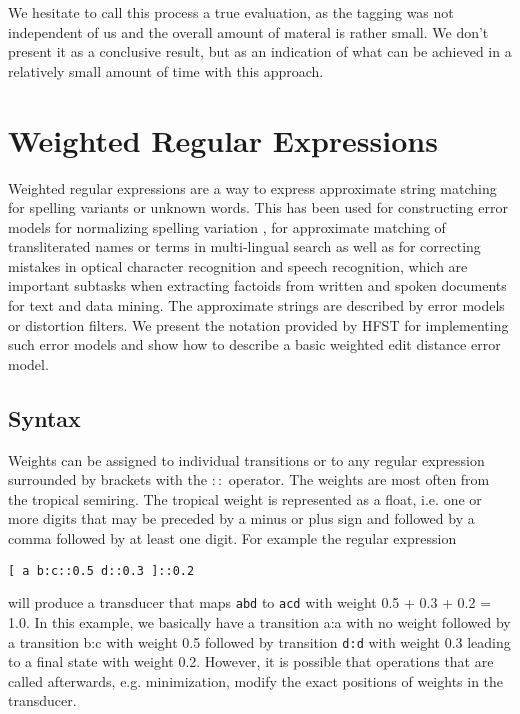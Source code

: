 \documentclass{llncs}
\begin{document}
We hesitate to call this process a true evaluation, as the tagging was not independent of us and
the overall amount of materal is rather small. We don't present it as a conclusive result,
but as an indication of what can be achieved in a relatively small amount of time with this approach.

\section{Weighted Regular Expressions}

Weighted regular expressions are a way to express approximate string matching for spelling variants or 
unknown words. This has been used for constructing error models for normalizing spelling variation \cite{pirinen2014}, 
for approximate matching of transliterated names or terms in multi-lingual search \cite{Linden06multilingualmodeling}
as well as for correcting mistakes in optical character recognition and speech recognition, which are important subtasks 
when extracting factoids from written and spoken documents
for text and data mining. The approximate strings are described by error models or distortion filters. 
We present the notation provided by HFST for implementing such error models and show how to describe 
a basic weighted edit distance error model.

\subsection{Syntax}

Weights can be assigned to individual transitions or to any regular expression surrounded by brackets
with the $::$ operator. The weights are most often from the tropical semiring. The tropical weight is
represented as a float, i.e. one or more digits that may be preceded by a minus or plus sign and followed
by a comma followed by at least one digit. For example the regular expression

\begin{center}
\begin{framed}
\begin{verbatim}
[ a b:c::0.5 d::0.3 ]::0.2
\end{verbatim}
\end{framed}
\end{center}

\noindent will produce a transducer that maps {\tt abd} to {\tt acd} with weight 0.5 + 0.3 + 0.2 = 1.0. In this example,
we basically have a transition a:a with no weight followed by a transition b:c with weight 0.5
followed by transition {\tt d:d} with weight 0.3 leading to a final state with weight 0.2. However, it is
possible that operations that are called afterwards, e.g. minimization, modify the exact positions
of weights in the transducer. 
\end{document}
